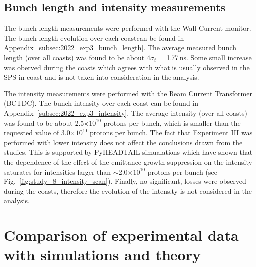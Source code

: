 \subsection{Bunch length and intensity measurements}\label{subsec:bunch_length_intensity_exp3}

The bunch length measurements were performed with the Wall Current monitor. The bunch length evolution over each coastcan be found in Appendix~\ref{subsec:2022_exp3_bunch_length}. The average measured bunch length (over all coasts) was found to be about $4\sigma_t$ = 1.77\,ns. Some small increase was oberved during the coasts which agrees with what is usually observed in the SPS in coast and is not taken into consideration in the analysis. 

The intensity measurements were performed with the Beam Current Transformer (BCTDC). The bunch intensity over each coast can be found in Appendix~\ref{subsec:2022_exp3_intensity}. The average intensity (over all coasts) was found to be about 2.5$\times 10^{10}$ protons per bunch, which is smaller than the requested value of 3.0$\times 10^{10}$ protons per bunch. The fact that Experiment III was performed with lower intensity does not affect the conclusions drawn from the studies. This is supported by PyHEADTAIL simualations which have shown that the dependence of the effect of the emittance growth suppression on the intensity saturates for intensities larger than $\sim$2.0$\times 10^{10}$ protons per bunch (see Fig.~\ref{fig:study_8_intensity_scan}). Finally, no significant, losses were observed during the coasts, therefore the evolution of the intensity is not considered in the analysis.



\section{Comparison of experimental data with simulations and theory}\label{sec:compare_measurements_pyheadtail_theory}

